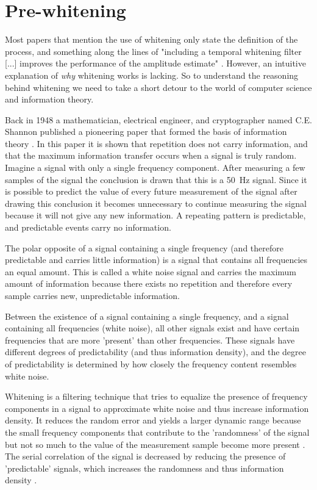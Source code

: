 \section{Pre-whitening}
Most  papers that mention the use of whitening only state the definition of the process, and something along the lines of "including a temporal whitening filter [...] improves the performance of the amplitude estimate" \cite{single_site_emg_amplitude_estimation}\cite{adaptive_whitening}\cite{emg_whitening}. However, an intuitive explanation of \textit{why} whitening works is lacking. So to understand the reasoning behind whitening we need to take a short detour to the world of computer science and information theory.

Back in 1948 a mathematician, electrical engineer, and cryptographer named C.E. Shannon published a pioneering paper that formed the basis of information theory \cite{shannon}. In this paper it is shown that repetition does not carry information, and that the maximum information transfer occurs when a signal is truly random. Imagine a signal with only a single frequency component. After measuring a few samples of the signal the conclusion is drawn that this is a \SI{50}{\hertz} signal. Since it is possible to predict the value of every future measurement of the signal after drawing this conclusion it becomes unnecessary to continue measuring the signal because it will not give any new information. A repeating pattern is predictable, and predictable events carry no information.

The polar opposite of a signal containing a single frequency (and therefore predictable and carries little information) is a signal that contains all frequencies an equal amount. This is called a white noise signal and carries the maximum amount of information because there exists no repetition and therefore every sample carries new, unpredictable information.

Between the existence of a signal containing a single frequency, and a signal containing all frequencies (white noise), all other signals exist and have certain frequencies that are more 'present' than other frequencies. These signals have different degrees of predictability (and thus information density), and the degree of predictability is determined by how closely the frequency content resembles white noise.

Whitening is a filtering technique that tries to equalize the presence of frequency components in a signal to approximate white noise and thus increase information density. It reduces the random error and yields a larger dynamic range because the small frequency components that contribute to the 'randomness' of the signal but not so much to the value of the measurement sample become more present \cite[Ch. 5.4.9]{time_series_analysis_methods}\cite{single_site_emg_amplitude_estimation}. The serial correlation of the signal is decreased by reducing the presence of 'predictable' signals, which increases the randomness and thus information density \cite{serial_correlation_definition}. 

